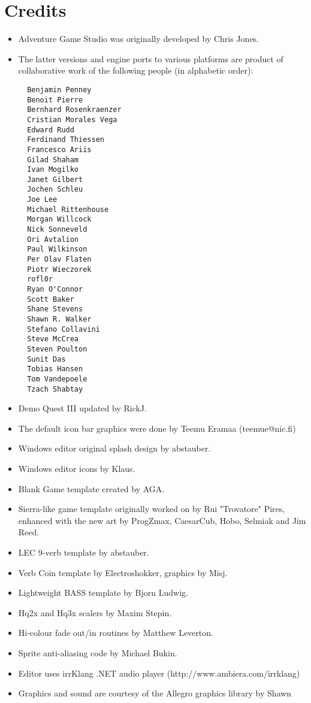 \chapter{Credits}\label{Credits}%

\begin{itemize}
\item Adventure Game Studio was originally developed by Chris Jones.
\item The latter versions and engine ports to various platforms are product of collaborative work of the following people (in alphabetic order):
\begin{verbatim}
  Benjamin Penney
  Benoit Pierre
  Bernhard Rosenkraenzer
  Cristian Morales Vega
  Edward Rudd
  Ferdinand Thiessen
  Francesco Ariis
  Gilad Shaham
  Ivan Mogilko
  Janet Gilbert
  Jochen Schleu
  Joe Lee
  Michael Rittenhouse
  Morgan Willcock
  Nick Sonneveld
  Ori Avtalion
  Paul Wilkinson
  Per Olav Flaten
  Piotr Wieczorek
  rofl0r
  Ryan O'Connor
  Scott Baker
  Shane Stevens
  Shawn R. Walker
  Stefano Collavini
  Steve McCrea
  Steven Poulton
  Sunit Das
  Tobias Hansen
  Tom Vandepoele
  Tzach Shabtay
\end{verbatim}
\item Demo Quest III updated by RickJ.
\item The default icon bar graphics were done by Teemu Eramaa (teemue@nic.fi)
\item Windows editor original splash design by abstauber.
\item Windows editor icons by Klaus.
\item Blank Game template created by AGA.
\item Sierra-like game template originally worked on by Rui "Trovatore" Pires, enhanced with the new art by ProgZmax, CaesarCub, Hobo, Selmiak and Jim Reed.
\item LEC 9-verb template by abstauber.
\item Verb Coin template by Electroshokker, graphics by Misj.
\item Lightweight BASS template by Bjorn Ludwig.
\item Hq2x and Hq3x scalers by Maxim Stepin.
\item Hi-colour fade out/in routines by Matthew Leverton.
\item Sprite anti-aliasing code by Michael Bukin.
\item Editor uses irrKlang .NET audio player (http://www.ambiera.com/irrklang)
\item Graphics and sound are courtesy of the Allegro graphics library by Shawn

\end{itemize}
